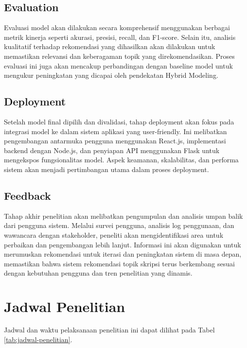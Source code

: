 \subsection{Evaluation}
Evaluasi model akan dilakukan secara komprehensif menggunakan berbagai metrik kinerja seperti akurasi, presisi, recall, dan F1-score. Selain itu, analisis kualitatif terhadap rekomendasi yang dihasilkan akan dilakukan untuk memastikan relevansi dan keberagaman topik yang direkomendasikan. Proses evaluasi ini juga akan mencakup perbandingan dengan baseline model untuk mengukur peningkatan yang dicapai oleh pendekatan Hybrid Modeling.

\subsection{Deployment}
Setelah model final dipilih dan divalidasi, tahap deployment akan fokus pada integrasi model ke dalam sistem aplikasi yang user-friendly. Ini melibatkan pengembangan antarmuka pengguna menggunakan React.js, implementasi backend dengan Node.js, dan penyiapan API menggunakan Flask untuk mengekspos fungsionalitas model. Aspek keamanan, skalabilitas, dan performa sistem akan menjadi pertimbangan utama dalam proses deployment.

\subsection{Feedback}
Tahap akhir penelitian akan melibatkan pengumpulan dan analisis umpan balik dari pengguna sistem. Melalui survei pengguna, analisis log penggunaan, dan wawancara dengan stakeholder, peneliti akan mengidentifikasi area untuk perbaikan dan pengembangan lebih lanjut. Informasi ini akan digunakan untuk merumuskan rekomendasi untuk iterasi dan peningkatan sistem di masa depan, memastikan bahwa sistem rekomendasi topik skripsi terus berkembang sesuai dengan kebutuhan pengguna dan tren penelitian yang dinamis.

\section{Jadwal Penelitian}
Jadwal dan waktu pelaksanaan penelitian ini dapat dilihat pada Tabel \ref{tab:jadwal-penelitian}. 

